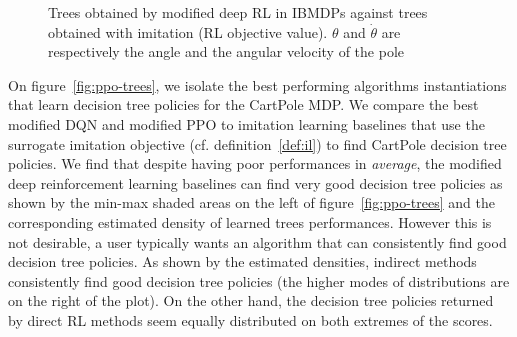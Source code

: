 \begin{figure}
    \caption{Trees obtained by modified deep RL in IBMDPs against trees obtained with imitation (RL objective value). $\theta$ and $\dot{\theta}$ are respectively the angle and the angular velocity of the pole}
    \label{fig:trees-drl}
\end{figure}


On figure~\ref{fig:ppo-trees}, we isolate the best performing algorithms instantiations that learn decision tree policies for the CartPole MDP.
We compare the best modified DQN and modified PPO to imitation learning baselines that use the surrogate imitation objective (cf. definition~\ref{def:il}) to find CartPole decision tree policies.
We find that despite having poor performances in \textit{average}, the modified deep reinforcement learning baselines can find very good decision tree policies as shown by the min-max shaded areas on the left of figure~\ref{fig:ppo-trees} and the corresponding estimated density of learned trees performances.
However this is not desirable, a user typically wants an algorithm that can consistently find good decision tree policies.
As shown by the estimated densities, indirect methods consistently find good decision tree policies (the higher modes of distributions are on the right of the plot).
On the other hand, the decision tree policies returned by direct RL methods seem equally distributed on both extremes of the scores.

